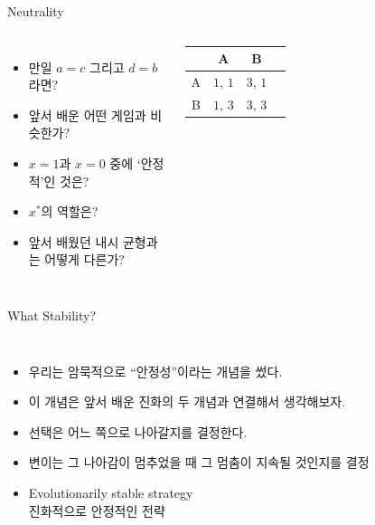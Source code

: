 \documentclass[final]{beamer}
\begin{document}
\begin{frame}[t]{Neutrality}
	\begin{columns}[c]
		\column{17em}
		\begin{itemize}
		\item 만일 $a=c$ 그리고 $d=b$ 라면?
		\item 앞서 배운 어떤 게임과 비슷한가? 
		\item $x=1$과 $x=0$ 중에 `안정적'인 것은?
		\item $x^*$의 역할은?
		\item 앞서 배웠던 내시 균형과는 어떻게 다른가? 
		\end{itemize}
		\column{14em}
		\hspace{-1em}
		\begin{table}
		\setlength{\tabcolsep}{1.2em}
		\begin{tabular}{|c|c|c|c|} \hline
		& {A} &  {B}\\ \hline
		{A} & {$1$}, {$1$} & {$3$}, {$1$} \\ \hline%
		{B} & {$1$}, {$3$}  & {$3$}, {$3$}\\ 
		\hline
		\end{tabular}
		\end{table}
	\end{columns}
\end{frame}

\begin{frame}[t]{What Stability?}
	\begin{columns}[c]
	\column{20em}
	\begin{itemize}
	\item 우리는 암묵적으로 ``안정성''이라는 개념을 썼다. 
	\item 이 개념은 앞서 배운 진화의 두 개념과 연결해서 생각해보자. 
	\item 선택은 어느 쪽으로 나아갈지를 결정한다. 
	\item 변이는 그 나아감이 멈추었을 때 그 멈춤이 지속될 것인지를 결정
	\item Evolutionarily stable strategy\\진화적으로 안정적인 전략 
	\end{itemize}
	\column{11em}
	\hspace{-1em}
	\end{columns}
\end{frame}
\end{document}
